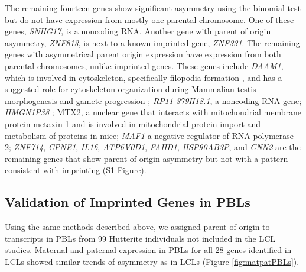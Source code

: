 The remaining fourteen genes show significant asymmetry using the binomial test but do not have expression from mostly one parental chromosome. One of these genes, \emph{SNHG17}, is a noncoding RNA. Another gene with parent of origin asymmetry,  \emph{ZNF813}, is next to a known imprinted gene, \emph{ZNF331}. The remaining genes with asymmetrical parent origin expression have expression from both parental chromosomes, unlike imprinted genes. These genes include  \emph{DAAM1},  which is involved in cytoskeleton, specifically filopodia formation \citep{Hoffmann:2014ki, Luo:2016db}, and has a suggested role for cytoskeleton organization during Mammalian testis morphogenesis and gamete progression \citep{Pariante:2016kn};  \emph{RP11-379H18.1}, a noncoding RNA gene;  \emph{HMGN1P38} \citep{StrichmanAlmashanu:2003cw}; MTX2, a nuclear gene that interacts with mitochondrial membrane protein metaxin 1 and is involved in mitochondrial protein import and metabolism of proteins in mice;   \emph{MAF1} a negative regulator of RNA polymerase 2;  \emph{ZNF714},  \emph{CPNE1},  \emph{IL16},  \emph{ATP6V0D1},  \emph{FAHD1},  \emph{HSP90AB3P}, and  \emph{CNN2} are the remaining genes that show parent of origin asymmetry but not with a pattern consistent with imprinting (S1 Figure).

\subsection{Validation of Imprinted Genes in PBLs}\label{Validation of Imprinted Genes in PBLs}
Using the same methods described above, we assigned parent of origin to transcripts in PBLs from 99 Hutterite individuals not included in the LCL studies. Maternal and paternal expression in PBLs for all 28 genes identified in LCLs showed similar trends of asymmetry as in LCLs (Figure \ref{fig:matpatPBLs}). 


